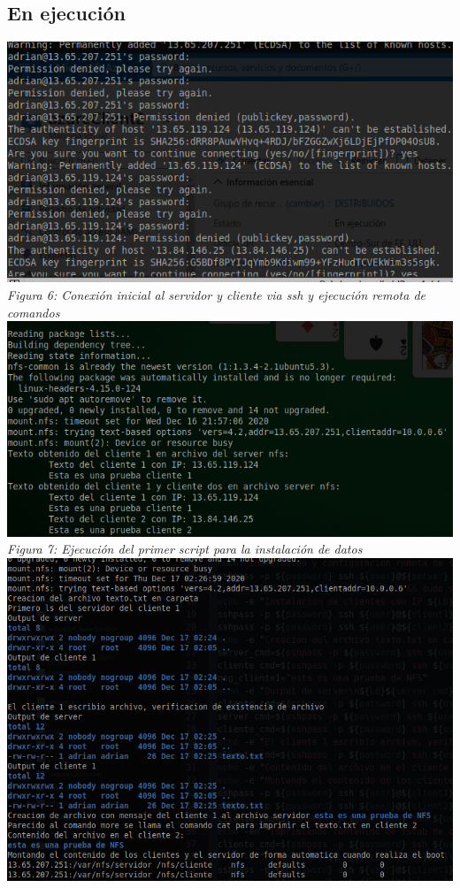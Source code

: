 \documentclass[10pt,executivepaper]{article}
\begin{document}
\subsection{En ejecución}
\begin{center}
  \includegraphics[scale=0.5]{imgs/first_con.png}\\
  \textit{Figura 6: Conexión inicial al servidor y cliente via ssh y ejecución remota de comandos}\\
  \includegraphics[scale=0.5]{imgs/ejecucion_script.png}\\
  \textit{Figura 7: Ejecución del primer script para la instalación de datos}\\
  \includegraphics[scale=0.5]{imgs/script_archivo_contenido.png}\\

\end{center}
\end{document}
